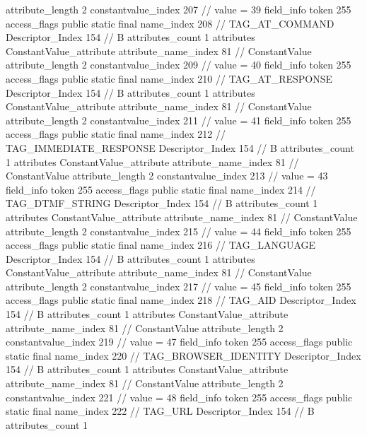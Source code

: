 {{{{{{{					attribute_length	2
					constantvalue_index	207		// value = 39
				}
				}
			}
			field_info {
				token	255
				access_flags	public static final
				name_index	208		// TAG_AT_COMMAND
				Descriptor_Index	154		// B
				attributes_count	1
				attributes {
				ConstantValue_attribute {
					attribute_name_index	81		// ConstantValue
					attribute_length	2
					constantvalue_index	209		// value = 40
				}
				}
			}
			field_info {
				token	255
				access_flags	public static final
				name_index	210		// TAG_AT_RESPONSE
				Descriptor_Index	154		// B
				attributes_count	1
				attributes {
				ConstantValue_attribute {
					attribute_name_index	81		// ConstantValue
					attribute_length	2
					constantvalue_index	211		// value = 41
				}
				}
			}
			field_info {
				token	255
				access_flags	public static final
				name_index	212		// TAG_IMMEDIATE_RESPONSE
				Descriptor_Index	154		// B
				attributes_count	1
				attributes {
				ConstantValue_attribute {
					attribute_name_index	81		// ConstantValue
					attribute_length	2
					constantvalue_index	213		// value = 43
				}
				}
			}
			field_info {
				token	255
				access_flags	public static final
				name_index	214		// TAG_DTMF_STRING
				Descriptor_Index	154		// B
				attributes_count	1
				attributes {
				ConstantValue_attribute {
					attribute_name_index	81		// ConstantValue
					attribute_length	2
					constantvalue_index	215		// value = 44
				}
				}
			}
			field_info {
				token	255
				access_flags	public static final
				name_index	216		// TAG_LANGUAGE
				Descriptor_Index	154		// B
				attributes_count	1
				attributes {
				ConstantValue_attribute {
					attribute_name_index	81		// ConstantValue
					attribute_length	2
					constantvalue_index	217		// value = 45
				}
				}
			}
			field_info {
				token	255
				access_flags	public static final
				name_index	218		// TAG_AID
				Descriptor_Index	154		// B
				attributes_count	1
				attributes {
				ConstantValue_attribute {
					attribute_name_index	81		// ConstantValue
					attribute_length	2
					constantvalue_index	219		// value = 47
				}
				}
			}
			field_info {
				token	255
				access_flags	public static final
				name_index	220		// TAG_BROWSER_IDENTITY
				Descriptor_Index	154		// B
				attributes_count	1
				attributes {
				ConstantValue_attribute {
					attribute_name_index	81		// ConstantValue
					attribute_length	2
					constantvalue_index	221		// value = 48
				}
				}
			}
			field_info {
				token	255
				access_flags	public static final
				name_index	222		// TAG_URL
				Descriptor_Index	154		// B
				attributes_count	1
}}}}}
